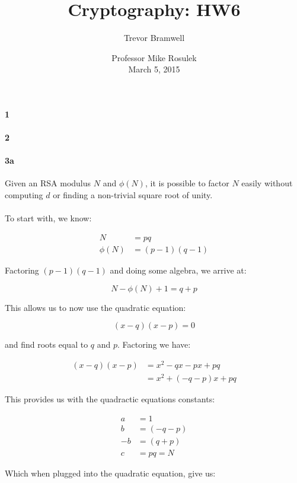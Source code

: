 \documentclass[12pt]{article}
\title{Cryptography: HW6}
\author{Trevor Bramwell}
\date{
    Professor Mike Rosulek\\
    March 5, 2015
}
\begin{document}
\maketitle


\paragraph{1} 

\paragraph{2}

\paragraph{3a}

Given an RSA modulus $N$ and $\phi{(N)}$, it is possible to factor $N$
easily without computing $d$ or finding a non-trivial square root of
unity.
\\\\
To start with, we know:

\begin{align*}
    N &= pq \\
    \phi{(N)} &= (p - 1)(q - 1)
\end{align*}

Factoring $(p - 1)(q - 1)$ and doing some algebra, we arrive at:

\[
    N - \phi{(N)} + 1 = q + p
\]

This allows us to now use the quadratic equation:

\[
    (x - q)(x - p) = 0
\]

and find roots equal to $q$ and $p$. Factoring we have:

\begin{align*}
    (x - q)(x - p) &= x^2 - qx - px + pq \\
    &= x^2 + (-q - p)x + pq
\end{align*}

This provides us with the quadractic equations constants:

\begin{align*}
    a &= 1 \\
    b &= (-q - p) \\
   -b &= (q + p) \\
    c &= pq = N
\end{align*}

Which when plugged into the quadratic equation, give us:
\end{document}
